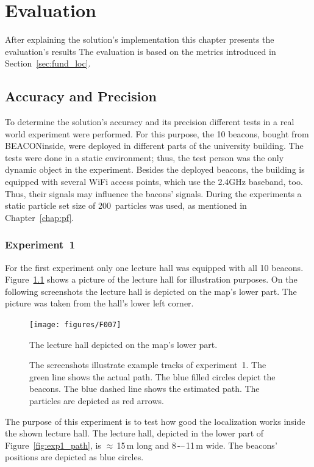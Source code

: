 \chapter{Evaluation} \label{chap:evaluation}
After explaining the solution's implementation this chapter presents the evaluation's results The evaluation is based on the metrics introduced in Section~\ref{sec:fund_loc}.

\section{Accuracy and Precision}
To determine the solution's accuracy and its precision different tests in a real world experiment were performed. For this purpose, the 10 beacons, bought from BEACONinside, were deployed in different parts of the university building. The tests were done in a static environment; thus, the test person was the only dynamic object in the experiment. Besides the deployed beacons, the building is equipped with several WiFi access points, which use the 2.4GHz baseband, too. Thus, their signals may influence the bacons' signals. During the experiments a static particle set size of 200~particles was used, as mentioned in Chapter~\ref{chap:pf}.

\subsection*{Experiment~1}
For the first experiment only one lecture hall was equipped with all 10 beacons. Figure~\ref{fig:f007} shows a picture of the lecture hall for illustration purposes. On the following screenshots the lecture hall is depicted on the map's lower part. The picture was taken from the hall's lower left corner.

\begin{figure}
	\texttt{[image: figures/F007]}
	\caption{The lecture hall depicted on the map's lower part.}
	\label{fig:f007}
\end{figure}

\begin{figure}
	
	\caption{The screenshots illustrate example tracks of experiment~1. The green line shows the actual path. The blue filled circles depict the beacons. The blue dashed line shows the estimated path. The particles are depicted as red arrows.}
	\label{fig:exp1_screenshot}
\end{figure}

The purpose of this experiment is to test how good the localization works inside the shown lecture hall. The lecture hall, depicted in the lower part of Figure~\ref{fig:exp1_path}, is  $\approx$\,15\,m long and 8\,-–\,11\,m wide. The beacons' positions are depicted as blue circles.

